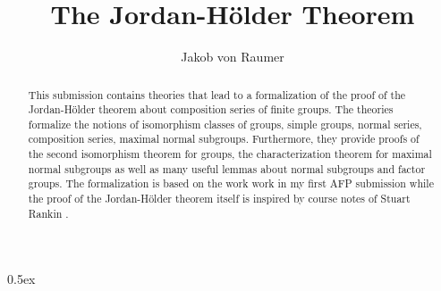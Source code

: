 \documentclass[11pt,a4paper]{article}
\begin{document}
\title{The Jordan-H\"older Theorem}
\author{Jakob von Raumer}
\maketitle

\begin{abstract}
This submission contains theories that lead to a formalization of the proof of the Jordan-H\"older theorem about composition series of finite groups. The theories formalize the notions of isomorphism classes of groups, simple groups, normal series, composition series, maximal normal subgroups. Furthermore, they provide proofs of the second isomorphism theorem for groups, the characterization theorem for maximal normal subgroups as well as many useful lemmas about normal subgroups and factor groups. The formalization is based on the work work in my first AFP submission \cite{snd-sylow} while the proof of the Jordan-H\"older theorem itself is inspired by course notes of Stuart Rankin \cite{rankin}.
\end{abstract}

\tableofcontents

\parindent 0pt\parskip 0.5ex





\end{document}
